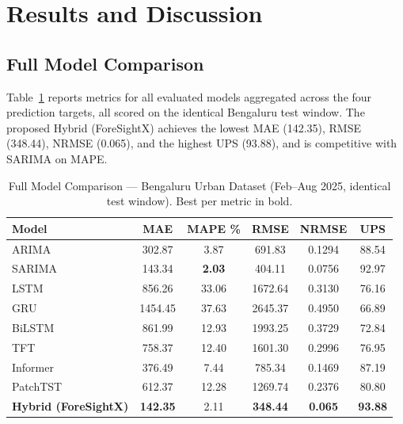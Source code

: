 \documentclass[conference]{IEEEtran}
\begin{document}
\section{Results and Discussion}
\subsection{Full Model Comparison}
Table~\ref{tab:full} reports metrics for all evaluated models aggregated across the four prediction targets, all scored on the identical Bengaluru test window. The proposed Hybrid (ForeSightX) achieves the lowest MAE (142.35), RMSE (348.44), NRMSE (0.065), and the highest UPS (93.88), and is competitive with SARIMA on MAPE.

\begin{table}[t]
\centering
\caption{Full Model Comparison --- Bengaluru Urban Dataset (Feb--Aug 2025, identical test window). Best per metric in bold.}
\label{tab:full}
\begin{tabular}{lccccc}
\toprule
\textbf{Model} & \textbf{MAE} & \textbf{MAPE \%} & \textbf{RMSE} & \textbf{NRMSE} & \textbf{UPS} \\
\midrule
ARIMA    & 302.87 & 3.87 & 691.83 & 0.1294 & 88.54 \\
SARIMA   & 143.34 & \textbf{2.03} & 404.11 & 0.0756 & 92.97 \\
LSTM     & 856.26 & 33.06 & 1672.64 & 0.3130 & 76.16 \\
GRU      & 1454.45 & 37.63 & 2645.37 & 0.4950 & 66.89 \\
BiLSTM   & 861.99 & 12.93 & 1993.25 & 0.3729 & 72.84 \\
TFT      & 758.37 & 12.40 & 1601.30 & 0.2996 & 76.95 \\
Informer & 376.49 & 7.44 & 785.34 & 0.1469 & 87.19 \\
PatchTST & 612.37 & 12.28 & 1269.74 & 0.2376 & 80.80 \\
\textbf{Hybrid (ForeSightX)} & \textbf{142.35} & 2.11 & \textbf{348.44} & \textbf{0.065} & \textbf{93.88} \\
\bottomrule
\end{tabular}
\end{table}
\end{document}
